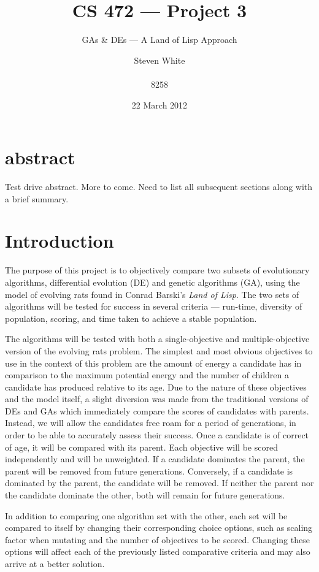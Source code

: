 \documentclass{sig-alternate}
\title{CS 472 --- Project 3}
\subtitle {GAs \& DEs --- A Land of Lisp Approach}
\author{
\alignauthor
Steven White \\
  \email{swhite24@mix.wvu.edu}\\
  8258
}
\begin{document}
\date{22 March 2012}

\maketitle
\section{abstract}
Test drive abstract. More to come.  Need to list all subsequent
sections along with a brief summary.

\section{Introduction}
\label{sec:Introduction}
The purpose of this project is to objectively compare two subsets of evolutionary algorithms, differential evolution (DE) and genetic algorithms (GA), using the model of evolving rats found in Conrad Barski's \emph{Land of Lisp}.  The two sets of algorithms will be tested for success in several criteria --- run-time, diversity of population, scoring, and time taken to achieve a stable population.

The algorithms will be tested with both a single-objective and multiple-objective version of the evolving rats problem.  The simplest and most obvious objectives to use in the context of this problem are the amount of energy a candidate has in comparison to the maximum potential energy and the number of children a candidate has produced relative to its age.  Due to the nature of these objectives and the model itself, a slight diversion was made from the traditional versions of DEs and GAs which immediately compare the scores of candidates with parents.  Instead, we will allow the candidates free roam for a period of generations, in order to be able to accurately assess their success.  Once a candidate is of correct of age, it will be compared with its parent.  Each objective will be scored independently and will be unweighted.  If a candidate dominates the parent, the parent will be removed from future generations.  Conversely, if a candidate is dominated by the parent, the candidate will be removed.  If neither the parent nor the candidate dominate the other, both will remain for future generations.

In addition to comparing one algorithm set with the other, each set will be compared to itself by changing their corresponding choice options, such as scaling factor when mutating and the number of objectives to be scored.  Changing these options will affect each of the previously listed comparative criteria and may also arrive at a better solution.
\end{document}
